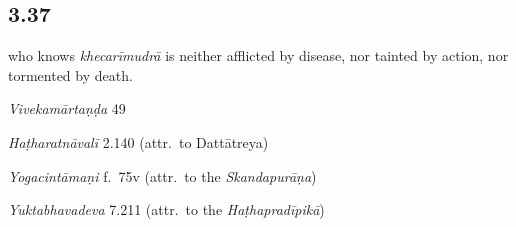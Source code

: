 \begin{ekdosis}

\subsection*{3.37}
\begin{translation} who knows \emph{khecarīmudrā} is neither afflicted by disease, nor tainted by action, nor tormented by death.
\end{translation}

\begin{sources}[hp03_037]
\emph{Vivekamārtaṇḍa} 49
\begin{versinnote}
\end{versinnote}
\end{sources}

\begin{testimonia}[hp03_037]
\emph{Haṭharatnāvalī} 2.140 (attr.~to Dattātreya)
\begin{versinnote}
\end{versinnote}

\emph{Yogacintāmaṇi} f.~75v (attr.~to the \emph{Skandapurāṇa})
\begin{versinnote}
\end{versinnote}

\emph{Yuktabhavadeva} 7.211 (attr.~to the \emph{Haṭhapradīpikā})
\begin{versinnote}
\end{versinnote}
\end{testimonia}


\end{ekdosis}
